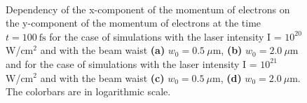 \begin{figure}[h!]
	\centering
	\\
	\caption{Dependency of the x-component of the momentum of electrons on the y-component of the  momentum of electrons at the time $ t = 100 \ \mathrm{fs} $ for the case of simulations with the laser intensity I = $ 10^{20} $ W/cm$^2$ and with the beam waist \textbf{(a)} $ w_0 = 0.5 \ \mu\mathrm{m} $, \textbf{(b)} $ w_0 = 2.0 \ \mu\mathrm{m} $ and for the case of simulations with the laser intensity I = $ 10^{21} $ W/cm$^2$ and with the beam waist \textbf{(c)} $ w_0 = 0.5 \ \mu\mathrm{m} $, \textbf{(d)} $ w_0 = 2.0 \ \mu\mathrm{m} $. The colorbars are in logarithmic scale.}
	\label{fig:12}
\end{figure}

